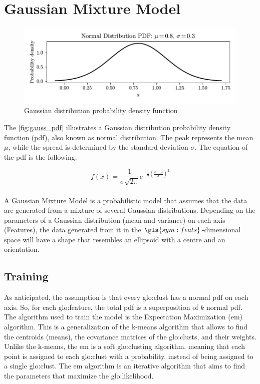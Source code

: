 \section{Gaussian Mixture Model}
\label{sec:gaussian}

\begin{figure}
    \centering
    \includegraphics{images/Gaussian/Figure_3.pdf}
    \caption{Gaussian distribution probability density function}
    \label{fig:gauss_pdf}
\end{figure}

The \autoref{fig:gauss_pdf} illustrates a Gaussian distribution probability density function (\gls{pdf}), also known as normal distribution. The peak represents the mean $\mu$, while the spread is determined by the standard deviation $\sigma$. The equation of the \gls{pdf} is the following:

$$
f(x) = \frac{1}{\sigma \sqrt{2\pi} } e^{-\frac{1}{2}\left(\frac{x-\mu}{\sigma}\right)^2}
$$

\paragraph*{}
A Gaussian Mixture Model is a probabilistic model that assumes that the data are generated from a mixture of several Gaussian distributions. Depending on the parameters of a Gaussian distribution (mean and variance) on each axis (Features), the data generated from it in the $\gls{sym:feats}$-dimensional space will have a shape that resembles an ellipsoid with a centre and an orientation.


\subsection{Training}
\label{sec:gauss_train}
As anticipated, the assumption is that every \gls{glo:clust} has a normal \gls{pdf} on each axis. So, for each \gls{glo:feature}, the total \gls{pdf} is a superposition of $k$ normal \gls{pdf}. 
The algorithm used to train the model is the Expectation Maximization (\gls{em}) algorithm. This is a generalization of the k-means algorithm that allows to find the centroids (means), the covariance matrices of the \gls{glo:clust}s, and their weights. Unlike the k-means, the \gls{em} is a soft \gls{glo:clust}ing algorithm, meaning that each point is assigned to each \gls{glo:clust} with a probability, instead of being assigned to a single \gls{glo:clust}.
The \gls{em} algorithm is an iterative algorithm that aims to find the parameters that maximize the \gls{glo:likelihood}.

